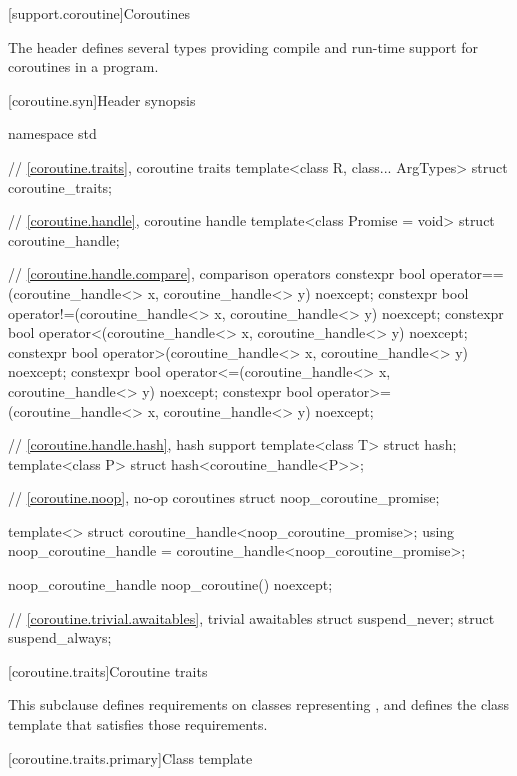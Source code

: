 [support.coroutine]{Coroutines}

\pnum
The header
defines several types providing
compile and run-time support for
coroutines in a \Cpp{} program.

[coroutine.syn]{Header  synopsis}

%
%
%
\begin{codeblock}
namespace std {
  // \ref{coroutine.traits}, coroutine traits
  template<class R, class... ArgTypes>
    struct coroutine_traits;

  // \ref{coroutine.handle}, coroutine handle
  template<class Promise = void>
    struct coroutine_handle;

  // \ref{coroutine.handle.compare}, comparison operators
  constexpr bool operator==(coroutine_handle<> x, coroutine_handle<> y) noexcept;
  constexpr bool operator!=(coroutine_handle<> x, coroutine_handle<> y) noexcept;
  constexpr bool operator<(coroutine_handle<> x, coroutine_handle<> y) noexcept;
  constexpr bool operator>(coroutine_handle<> x, coroutine_handle<> y) noexcept;
  constexpr bool operator<=(coroutine_handle<> x, coroutine_handle<> y) noexcept;
  constexpr bool operator>=(coroutine_handle<> x, coroutine_handle<> y) noexcept;

  // \ref{coroutine.handle.hash}, hash support
  template<class T> struct hash;
  template<class P> struct hash<coroutine_handle<P>>;

  // \ref{coroutine.noop}, no-op coroutines
  struct noop_coroutine_promise;

  template<> struct coroutine_handle<noop_coroutine_promise>;
  using noop_coroutine_handle = coroutine_handle<noop_coroutine_promise>;

  noop_coroutine_handle noop_coroutine() noexcept;

  // \ref{coroutine.trivial.awaitables}, trivial awaitables
  struct suspend_never;
  struct suspend_always;
}
\end{codeblock}

[coroutine.traits]{Coroutine traits}

\pnum
This subclause defines requirements on classes representing
,
and defines the class template
that satisfies those requirements.

[coroutine.traits.primary]{Class template }

